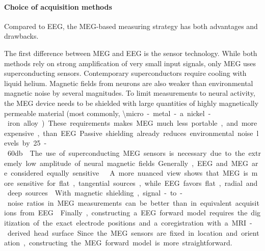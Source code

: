 \paragraph{Choice of acquisition methods}
Compared to EEG, the MEG-based measuring strategy has both advantages and drawbacks.


The first difference between MEG and EEG is the sensor technology.
While both methods rely on strong amplification of very small input signals, only MEG uses superconducting sensors.
Contemporary superconductors require cooling with liquid helium.
Magnetic fields from neurons are also weaker than environmental magnetic noise by several magnitudes.
To limit measurements to neural activity, the MEG device needs to be shielded with large quantities of highly magnetically permeable material (most commonly, \SI{\micro}-metal - a nickel-iron alloy).
These requirements makes MEG much less portable, and more expensive, than EEG.
Passive shielding already reduces environmental noise levels by 25-60db \cite{1.5.SNR}.
The use of superconducting MEG sensors is necessary due to the extremely low amplitude of neural magnetic fields.
Generally, EEG and MEG are considered equally sensitive \cite{1.5.MEG.a}\cite{1.5.MEG.c}.
A more nuanced view shows that MEG is more sensitive for flat, tangential sources, while EEG favors flat, radial and deep sources \cite{1.5.sensitivity}.
With magnetic shielding, signal-to-noise ratios in MEG measurements can be better than in equivalent acquisitions from EEG \cite{1.5.SNR}.
Finally, constructing a EEG forward model requires the digitization of the exact electrode positions and a coregistration with a MRI-derived head surface.
Since the MEG sensors are fixed in location and orientation, constructing the MEG forward model is more straightforward.


